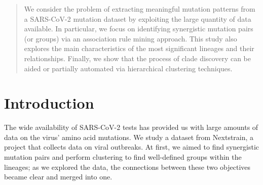\documentclass[a0,landscape]{a0poster}
\begin{document}
\begin{multicols}{4} %


\color{black} %

	\begin{abstract}
		
	\noindent We consider the problem of extracting meaningful mutation patterns from a SARS-CoV-2 mutation dataset by exploiting the large quantity of data available. In particular, we focus on identifying synergistic mutation pairs (or groups) via an association rule mining approach. This study also explores the main characteristics of the most significant lineages and their relationships. Finally, we show that the process of clade discovery can be aided or partially automated via hierarchical clustering techniques. 
\end{abstract}


\color{Black} %

\section*{Introduction}

	The wide availability of SARS-CoV-2 tests has provided us with large amounts of data on the virus' amino acid mutations. We study a dataset from Nextstrain, a project that collects data on viral outbreaks. At first, we aimed to find synergistic mutation pairs and perform clustering to find well-defined groups within the lineages; as we explored the data, the connections between these two objectives became clear and merged into one.

\color{Black}

\end{multicols}
\end{document}

